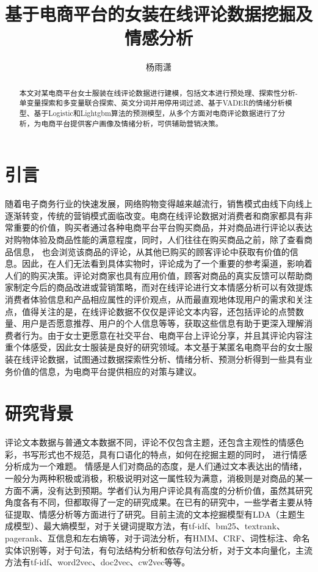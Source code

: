 \documentclass[
  journal=medium,
  manuscript=article-type,
  year=2023,
  volume=37,
]{cup-journal}
\title{基于电商平台的女装在线评论数据挖掘及情感分析}
\author{杨雨潇}
\affiliation{西安交通大学,西安,中国}
\begin{document}
\begin{abstract}

    本文对某电商平台女士服装在线评论数据进行建模，包括文本进行预处理、探索性分析-单变量探索和多变量联合探索、英文分词并用停用词过滤、基于VADER的情绪分析模型、基于Logistic和Lightgbm算法的预测模型，从多个方面对电商评论数据进行了分析，为电商平台提供客户画像及情绪分析，可供辅助营销决策。

\end{abstract}



\section{引言}

随着电子商务行业的快速发展，网络购物变得越来越流行，销售模式由线下向线上逐渐转变，传统的营销模式面临改变。电商在线评论数据对消费者和商家都具有非常重要的价值，购买者通过各种电商平台平台购买商品，并对商品进行评论以表达对购物体验及商品性能的满意程度，同时，人们往往在购买商品之前，除了查看商品信息， 也会浏览该商品的评论，从其他已购买的顾客评论中获取有价值的信息。因此，在人们无法看到具体实物时，评论成为了一个重要的参考渠道，影响着人们的购买决策。评论对商家也具有应用价值，顾客对商品的真实反馈可以帮助商家制定今后的商品改进或营销策略，而对在线评论进行文本情感分析可以有效提炼消费者体验信息和产品相应属性的评价观点，从而最直观地体现用户的需求和关注点，值得关注的是，在线评论数据不仅仅是评论文本内容，还包括评论的点赞数量、用户是否愿意推荐、用户的个人信息等等，获取这些信息有助于更深入理解消费者行为。由于女士更愿意在社交平台、电商平台上评论分享，并且其评论内容注重个体感受，因此女士服装是良好的研究领域。本文基于某匿名电商平台的女士服装在线评论数据，试图通过数据探索性分析、情绪分析、预测分析得到一些具有业务价值的信息，为电商平台提供相应的对策与建议。

\section{研究背景}

评论文本数据与普通文本数据不同，评论不仅包含主题，还包含主观性的情感色彩，书写形式也不规范，具有口语化的特点，如何在挖掘主题的同时， 进行情感分析成为一个难题。 情感是人们对商品的态度，是人们通过文本表达出的情绪，一般分为两种积极或消极，积极说明对这一属性较为满意，消极则是对商品的某一方面不满，没有达到预期。学者们认为用户评论具有高度的分析价值，虽然其研究角度各有不同，但都取得了一定的研究成果。在已有的研究中，一些学者主要从特征提取、情感分析等方面进行了研究。目前主流的文本挖掘模型有LDA（主题生成模型）、最大熵模型，对于关键词提取方法，有tf-idf、bm25、textrank、pagerank、互信息和左右熵等，对于词法分析，有HMM、CRF、词性标注、命名实体识别等，对于句法，有句法结构分析和依存句法分析，对于文本向量化，主流方法有tf-idf、word2vec、doc2vec、cw2vec等等。
\end{document}
